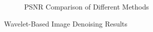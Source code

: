 \documentclass[12pt,a4paper]{article}
\begin{document}
\begin{figure}[H]
\begin{subfigure}[b]{0.48\textwidth}
    \caption{PSNR Comparison of Different Methods}
  \end{subfigure}
  \caption{Wavelet-Based Image Denoising Results}
  \label{fig:wavelet_denoising}
\end{figure}
\end{document}
